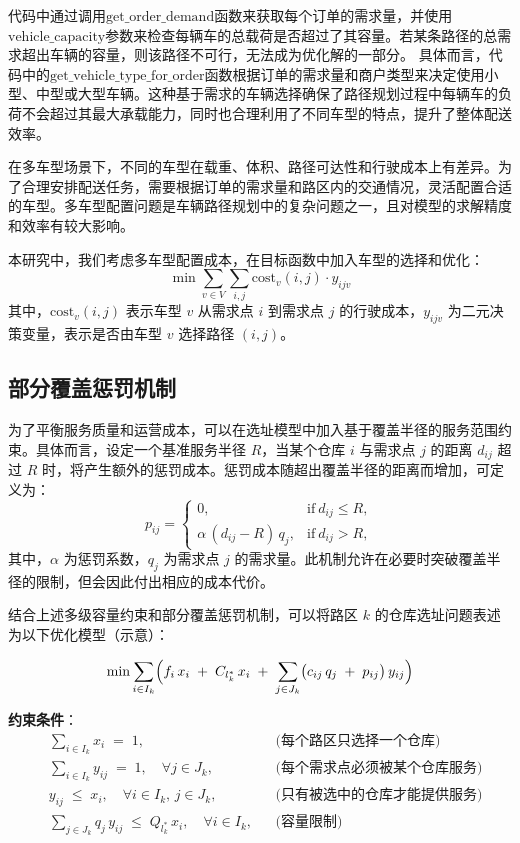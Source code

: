 \documentclass[12pt,a4paper,twoside]{ctexbook}
\begin{document}
代码中通过调用$ \text{get\_order\_demand} $函数来获取每个订单的需求量，并使用$ \text{vehicle\_capacity} $参数来检查每辆车的总载荷是否超过了其容量。若某条路径的总需求超出车辆的容量，则该路径不可行，无法成为优化解的一部分。
具体而言，代码中的$ \text{get\_vehicle\_type\_for\_order} $函数根据订单的需求量和商户类型来决定使用小型、中型或大型车辆。这种基于需求的车辆选择确保了路径规划过程中每辆车的负荷不会超过其最大承载能力，同时也合理利用了不同车型的特点，提升了整体配送效率。

在多车型场景下，不同的车型在载重、体积、路径可达性和行驶成本上有差异。为了合理安排配送任务，需要根据订单的需求量和路区内的交通情况，灵活配置合适的车型。多车型配置问题是车辆路径规划中的复杂问题之一，且对模型的求解精度和效率有较大影响。

本研究中，我们考虑多车型配置成本，在目标函数中加入车型的选择和优化：
\[
\min \sum_{v \in V} \sum_{i,j} \text{cost}_v(i,j) \cdot y_{ijv}
\]
其中，$\text{cost}_v(i,j)$ 表示车型 $v$ 从需求点 $i$ 到需求点 $j$ 的行驶成本，$y_{ijv}$ 为二元决策变量，表示是否由车型 $v$ 选择路径 $(i,j)$。

\subsection{部分覆盖惩罚机制}
为了平衡服务质量和运营成本，可以在选址模型中加入基于覆盖半径的服务范围约束。具体而言，设定一个基准服务半径 $R$，当某个仓库 $i$ 与需求点 $j$ 的距离 $d_{ij}$ 超过 $R$ 时，将产生额外的惩罚成本。惩罚成本随超出覆盖半径的距离而增加，可定义为：
\[
p_{ij} = 
\begin{cases}
0, & \text{if}\ d_{ij} \le R,\\[6pt]
\alpha\,(d_{ij} - R)\,q_j, & \text{if}\ d_{ij} > R,
\end{cases}
\]
其中，$\alpha$ 为惩罚系数，$q_j$ 为需求点 $j$ 的需求量。此机制允许在必要时突破覆盖半径的限制，但会因此付出相应的成本代价。

结合上述多级容量约束和部分覆盖惩罚机制，可以将路区 $k$ 的仓库选址问题表述为以下优化模型（示意）：

\begin{equation}
\min \sum_{i \in I_k} \Bigl(f_i \, x_i \;+\; C_{l_k^*}\, x_i \;+\; \sum_{j \in J_k} \bigl(c_{ij}\, q_j \;+\; p_{ij}\bigr)\, y_{ij}\Bigr)
\label{eq:objective}
\end{equation}

\noindent
\textbf{约束条件}：
\begin{align}
& \sum_{i \in I_k} x_i \;=\; 1, 
&& \text{(每个路区只选择一个仓库)} \label{eq:con1}\\[6pt]
& \sum_{i \in I_k} y_{ij} \;=\; 1, \quad \forall j \in J_k,
&& \text{(每个需求点必须被某个仓库服务)} \label{eq:con2}\\[6pt]
& y_{ij} \;\le\; x_i, \quad \forall i \in I_k,\, j \in J_k,
&& \text{(只有被选中的仓库才能提供服务)} \label{eq:con3}\\[6pt]
& \sum_{j \in J_k} q_j \, y_{ij} \;\le\; Q_{l_k^*}\, x_i, \quad \forall i \in I_k,
&& \text{(容量限制)} \label{eq:con4}
\end{align}
\end{document}
